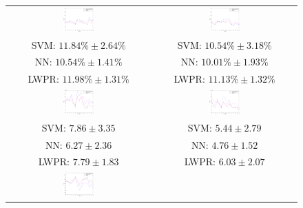 \begin{figure}[!ht] \centering
  \begin{tabular}{cc}
    \includegraphics[width=0.22\textwidth]{figs/fig_err_regr_resCrossBestOnDay1} &
    \includegraphics[width=0.22\textwidth]{figs/fig_err_regr_resCrossBestOnDay2} \\
     SVM: $11.84\% \pm 2.64\%$ &  SVM: $10.54\% \pm 3.18\%$ \\
      NN: $10.54\% \pm 1.41\%$ &   NN: $10.01\% \pm 1.93\%$ \\
    LWPR: $11.98\% \pm 1.31\%$ & LWPR: $11.13\% \pm 1.32\%$ \\
    \includegraphics[width=0.22\textwidth]{figs/fig_MSE_regr_resCrossBestOnDay1} &
    \includegraphics[width=0.22\textwidth]{figs/fig_MSE_regr_resCrossBestOnDay2} \\
     SVM: $7.86 \pm 3.35$ &  SVM: $5.44 \pm 2.79$ \\
      NN: $6.27 \pm 2.36$ &   NN: $4.76 \pm 1.52$ \\
    LWPR: $7.79 \pm 1.83$ & LWPR: $6.03 \pm 2.07$ \\
    \includegraphics[width=0.22\textwidth]{figs/fig_SCC_regr_resCrossBestOnDay1} &

\end{tabular}
\end{figure}
